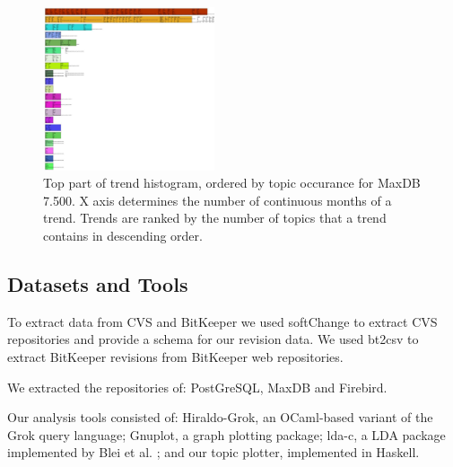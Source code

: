 \documentclass[times, 10pt,twocolumn]{article}
\begin{document}
\begin{figure}
  \centering
  \includegraphics[width=0.45\textwidth]{histogram-cropped-scaled}
  \caption{Top part of trend histogram, ordered by topic occurance for MaxDB 7.500. X axis determines the number of continuous months of a trend. Trends are ranked  by the number of topics that a trend contains in descending order.}       
  \label{fig:histogram}
\end{figure}


\subsection{Datasets and Tools}

To extract data from CVS and BitKeeper we used softChange to extract
CVS repositories and provide a schema for our revision data. We used
bt2csv to extract BitKeeper revisions from BitKeeper web repositories.

We extracted the repositories of: PostGreSQL, MaxDB and
Firebird.


Our analysis tools consisted of: Hiraldo-Grok, an OCaml-based variant
of the Grok query language; Gnuplot, a graph plotting package; lda-c,
a LDA package implemented by Blei et al. \cite{944937}; and our topic plotter, implemented
in Haskell.




\end{document}
